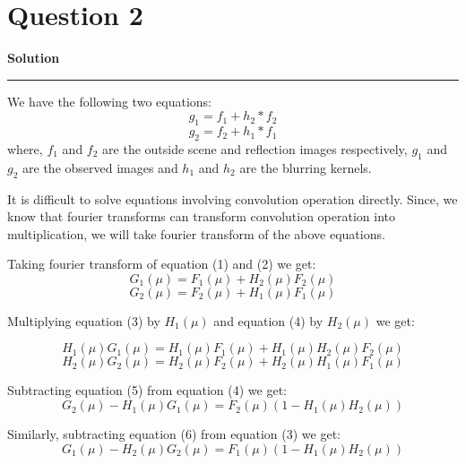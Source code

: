 \documentclass[a4paper,14pt]{article}
\title{\cooltitle{CS663 Assignment-5}}
\author{{\bf Saksham Rathi, Kavya Gupta, Shravan Srinivasa Raghavan} \\
\small Department of Computer Science, \\
Indian Institute of Technology Bombay \\}
\date{}
\newenvironment{solution}[2][]{%
    \begin{mdframed}[linecolor=blue!70!black, linewidth=2pt, roundcorner=10pt, backgroundcolor=yellow!10!white, skipabove=12pt, skipbelow=12pt]%
        \textbf{\large #2}
        \par\noindent\rule{\textwidth}{0.4pt}
}{
    \end{mdframed}
}
\begin{document}
\maketitle

\section*{Question 2}
\begin{solution}{Solution}
We have the following two equations:
\begin{equation}
    g_1 = f_1 + h_2*f_2
\end{equation}
\begin{equation}
    g_2 = f_2 + h_1*f_1
\end{equation}
where, $f_1$ and $f_2$ are the outside scene and reflection images respectively, $g_1$ and $g_2$ are the observed images and $h_1$ and $h_2$ are the blurring kernels.

It is difficult to solve equations involving convolution operation directly. Since, we know that fourier transforms can transform convolution operation into multiplication, we will take fourier transform of the above equations.

Taking fourier transform of equation (1) and (2) we get:
\begin{equation}
    G_1(\mu) = F_1(\mu) + H_2(\mu)F_2(\mu)
\end{equation}
\begin{equation}
    G_2(\mu) = F_2(\mu) + H_1(\mu)F_1(\mu)
\end{equation}

Multiplying equation (3) by $H_1(\mu)$ and equation (4) by $H_2(\mu)$ we get:

\begin{equation}
    H_1(\mu)G_1(\mu) = H_1(\mu)F_1(\mu) + H_1(\mu)H_2(\mu)F_2(\mu)
\end{equation}
\begin{equation}
    H_2(\mu)G_2(\mu) = H_2(\mu)F_2(\mu) + H_2(\mu)H_1(\mu)F_1(\mu)
\end{equation}

Subtracting equation (5) from equation (4) we get:
\begin{equation}
    G_2(\mu) - H_1(\mu)G_1(\mu) = F_2(\mu)(1 - H_1(\mu)H_2(\mu))
\end{equation}

Similarly, subtracting equation (6) from equation (3) we get:
\begin{equation}
    G_1(\mu) - H_2(\mu)G_2(\mu) = F_1(\mu)(1 - H_1(\mu)H_2(\mu))
\end{equation}


\end{solution}
\end{document}
